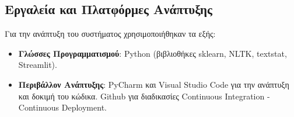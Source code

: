 \subsection{Εργαλεία και Πλατφόρμες Ανάπτυξης}
Για την ανάπτυξη του συστήματος χρησιμοποιήθηκαν τα εξής:
\begin{itemize}
    \item \textbf{Γλώσσες Προγραμματισμού}: Python (βιβλιοθήκες sklearn, NLTK, textstat, Streamlit).
    \item \textbf{Περιβάλλον Ανάπτυξης}: PyCharm και Visual Studio Code για την ανάπτυξη και δοκιμή του κώδικα. Github για διαδικασίες Continuous Integration - Continuous Deployment.
\end{itemize}








